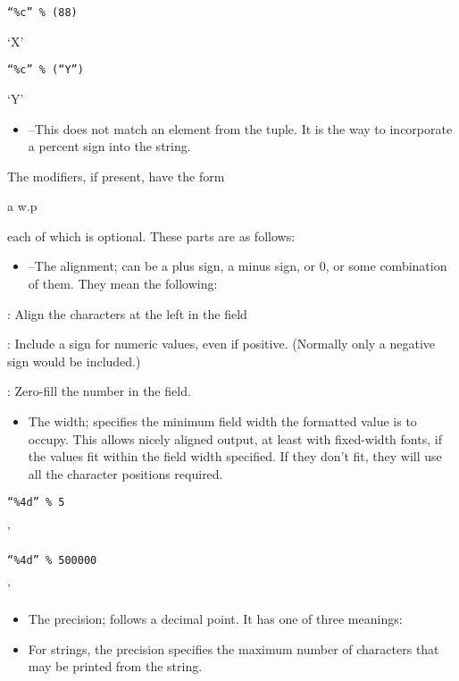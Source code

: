 \texttt{``\%c'' \% (88)}

`X'


\texttt{``\%c'' \% (``Y'')}

`Y'

\begin{itemize}

\item
   --This does not match
  an element from the tuple. It is the way to incorporate a percent sign
  into the string.
\end{itemize}

The modifiers, if present, have the
form

a w.p

each of which is optional. These
parts are as follows:

\begin{itemize}

\item
   --The alignment; can be
  a plus sign, a minus sign, or 0, or some combination of them. They
  mean the following:
\end{itemize}

 : Align the characters at
the left in the field

 : Include a sign for
numeric values, even if positive. (Normally only a negative sign would
be included.)

 : Zero-fill the number in
the field.

\begin{itemize}

\item
   The width;
  specifies the minimum field width the formatted value is to occupy.
  This allows nicely aligned output, at least with fixed-width fonts, if
  the values fit within the field width specified. If they don't fit,
  they will use all the character positions required.
\end{itemize}


\texttt{``\textbar{}\%4d\textbar{}'' \% 5}

'


\texttt{``\textbar{}\%4d\textbar{}'' \% 500000}

'

\begin{itemize}

\item
   The
  precision; follows a decimal point. It has one of three meanings:
\item
  For strings, the precision
  specifies the maximum number of characters that may be printed from
  the string.
\end{itemize}


